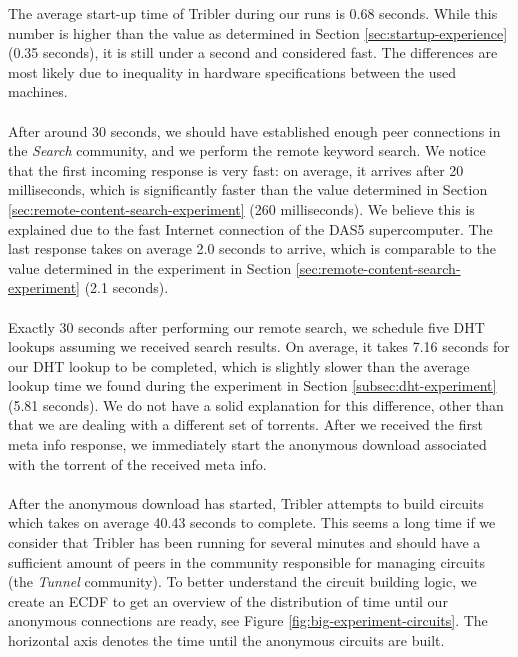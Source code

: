 \noindent The average start-up time of Tribler during our runs is 0.68 seconds. While this number is higher than the value as determined in Section \ref{sec:startup-experience} (0.35 seconds), it is still under a second and considered fast. The differences are most likely due to inequality in hardware specifications between the used machines.\\\\
After around 30 seconds, we should have established enough peer connections in the \emph{Search} community, and we perform the remote keyword search. We notice that the first incoming response is very fast: on average, it arrives after 20 milliseconds, which is significantly faster than the value determined in Section \ref{sec:remote-content-search-experiment} (260 milliseconds). We believe this is explained due to the fast Internet connection of the DAS5 supercomputer. The last response takes on average 2.0 seconds to arrive, which is comparable to the value determined in the experiment in Section \ref{sec:remote-content-search-experiment} (2.1 seconds).\\\\
Exactly 30 seconds after performing our remote search, we schedule five DHT lookups assuming we received search results. On average, it takes 7.16 seconds for our DHT lookup to be completed, which is slightly slower than the average lookup time we found during the experiment in Section \ref{subsec:dht-experiment} (5.81 seconds). We do not have a solid explanation for this difference, other than that we are dealing with a different set of torrents. After we received the first meta info response, we immediately start the anonymous download associated with the torrent of the received meta info.\\\\
After the anonymous download has started, Tribler attempts to build circuits which takes on average 40.43 seconds to complete. This seems a long time if we consider that Tribler has been running for several minutes and should have a sufficient amount of peers in the community responsible for managing circuits (the \emph{Tunnel} community). To better understand the circuit building logic, we create an ECDF to get an overview of the distribution of time until our anonymous connections are ready, see Figure \ref{fig:big-experiment-circuits}. The horizontal axis denotes the time until the anonymous circuits are built.\\


